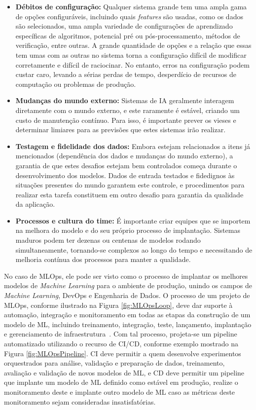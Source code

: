 \documentclass[portugues]{ic-tese}
\begin{document}
\begin{itemize}
    \item \textbf{Débitos de configuração:} Qualquer sistema grande tem uma ampla gama de opções configuráveis, incluindo quais \textit{features} são usadas, como os dados são selecionados, uma ampla variedade de configurações de aprendizado específicas de algoritmos, potencial pré ou pós-processamento, métodos de verificação, entre outras. A grande quantidade de opções e a relação que essas tem umas com as outras no sistema torna a configuração difícil de modificar corretamente e difícil de raciocinar. No entanto, erros na configuração podem custar caro, levando a sérias perdas de tempo, desperdício de recursos de computação ou problemas de produção.
    \item \textbf{Mudanças do mundo externo:} Sistemas de IA geralmente interagem diretamente com o mundo externo, e este raramente é estável, criando um custo de manutenção contínuo. Para isso, é importante prever os vieses e determinar limiares para as previsões que estes sistemas irão realizar.
    \item \textbf{Testagem e fidelidade dos dados:} Embora estejam relacionados a itens já mencionados (dependência dos dados e mudanças do mundo externo), a garantia de que estes desafios estejam bem controlados começa durante o desenvolvimento dos modelos. Dados de entrada testados e fidedignos às situações presentes do mundo garantem este controle, e procedimentos para realizar esta tarefa constituem em outro desafio para garantia da qualidade da aplicação.
    \item \textbf{Processos e cultura do time:} É importante criar equipes que se importem na melhora do modelo e do seu próprio processo de implantação. Sistemas maduros podem ter dezenas ou centenas de modelos rodando simultaneamente, tornando-se complexos ao longo do tempo e necessitando de melhoria contínua dos processos para manter a qualidade.
\end{itemize}

No caso de MLOps, ele pode ser visto como o processo de implantar os melhores modelos de \textit{Machine Learning} para o ambiente de produção, unindo os campos de \textit{Machine Learning}, DevOps e Engenharia de Dados. O processo de um projeto de MLOps, conforme ilustrado na Figura \ref{fig:MLOpsLoop}, deve dar suporte à automação, integração e monitoramento em todas as etapas da construção de um modelo de ML, incluindo treinamento, integração, teste, lançamento, implantação e gerenciamento de infraestrutura~\citep{Testi_2022}. Com tal processo, projeta-se um pipeline automatizado utilizando o recurso de CI/CD, conforme exemplo mostrado na Figura \ref{fig:MLOpsPipeline}. CI deve permitir a quem desenvolve experimentos orquestrados para análise, validação e preparação de dados, treinamento, avaliação e validação de novos modelos de ML, e CD deve permitir um pipeline que implante um modelo de ML definido como estável em produção, realize o monitoramento deste e implante outro modelo de ML caso as métricas deste monitoramento sejam consideradas insatisfatórias.
\end{document}
